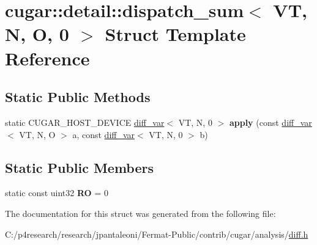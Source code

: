 \hypertarget{structcugar_1_1detail_1_1dispatch__sum_3_01_v_t_00_01_n_00_01_o_00_010_01_4}{}\section{cugar\+:\+:detail\+:\+:dispatch\+\_\+sum$<$ VT, N, O, 0 $>$ Struct Template Reference}
\label{structcugar_1_1detail_1_1dispatch__sum_3_01_v_t_00_01_n_00_01_o_00_010_01_4}
\subsection*{Static Public Methods}
\begin{DoxyCompactItemize}
\item 
\mbox{\label{structcugar_1_1detail_1_1dispatch__sum_3_01_v_t_00_01_n_00_01_o_00_010_01_4_a28322877394058f7375ea882ad729129}} 
static C\+U\+G\+A\+R\+\_\+\+H\+O\+S\+T\+\_\+\+D\+E\+V\+I\+CE \hyperlink{structcugar_1_1diff__var}{diff\+\_\+var}$<$ VT, N, 0 $>$ {\bfseries apply} (const \hyperlink{structcugar_1_1diff__var}{diff\+\_\+var}$<$ VT, N, O $>$ a, const \hyperlink{structcugar_1_1diff__var}{diff\+\_\+var}$<$ VT, N, 0 $>$ b)
\end{DoxyCompactItemize}
\subsection*{Static Public Members}
\begin{DoxyCompactItemize}
\item 
\mbox{\label{structcugar_1_1detail_1_1dispatch__sum_3_01_v_t_00_01_n_00_01_o_00_010_01_4_a09a11412c9809c0230de6ec126880b51}} 
static const uint32 {\bfseries RO} = 0
\end{DoxyCompactItemize}


The documentation for this struct was generated from the following file\+:\begin{DoxyCompactItemize}
\item 
C\+:/p4research/research/jpantaleoni/\+Fermat-\/\+Public/contrib/cugar/analysis/\hyperlink{diff_8h}{diff.\+h}\end{DoxyCompactItemize}
